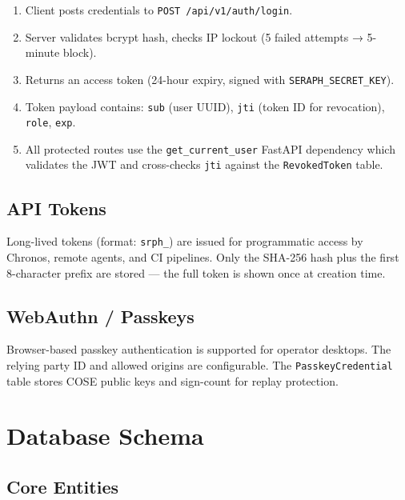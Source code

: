 \documentclass[11pt,a4paper,twoside,openright]{book}
\begin{document}
\begin{enumerate}[leftmargin=*]
  \item Client posts credentials to \texttt{POST /api/v1/auth/login}.
  \item Server validates bcrypt hash, checks IP lockout (5 failed attempts → 5-minute block).
  \item Returns an access token (24-hour expiry, signed with \texttt{SERAPH\_SECRET\_KEY}).
  \item Token payload contains: \texttt{sub} (user UUID), \texttt{jti} (token ID for revocation), \texttt{role}, \texttt{exp}.
  \item All protected routes use the \texttt{get\_current\_user} FastAPI dependency which validates the JWT and cross-checks \texttt{jti} against the \texttt{RevokedToken} table.
\end{enumerate}

\subsection{API Tokens}

Long-lived tokens (format: \texttt{srph\_<32 random chars>}) are issued for programmatic access by Chronos, remote agents, and CI pipelines. Only the SHA-256 hash plus the first 8-character prefix are stored — the full token is shown once at creation time.

\subsection{WebAuthn / Passkeys}

Browser-based passkey authentication is supported for operator desktops. The relying party ID and allowed origins are configurable. The \texttt{PasskeyCredential} table stores COSE public keys and sign-count for replay protection.

\section{Database Schema}

\subsection{Core Entities}
\end{document}
